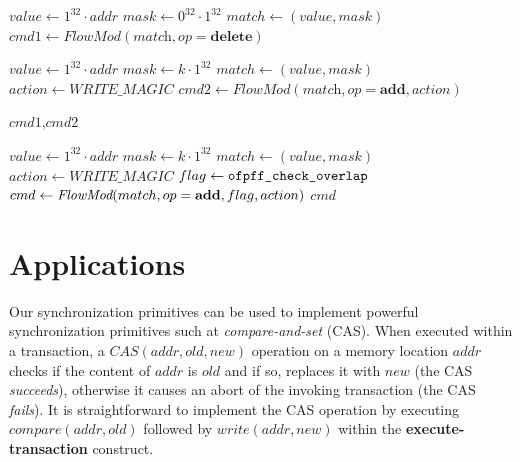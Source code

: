 \documentclass[conference]{sigcomm-alternate}
\newcommand{\concat}[0]{\cdot}
\newcommand{\cas}{CAS\xspace}
\newcommand{\compare}{compare\xspace}
\newcommand{\memwrite}{write\xspace}
\newcommand{\addr}{\textit{addr}\xspace}
\newcommand{\add}{\textbf{add}\xspace}
\newcommand{\dele}{\textbf{delete}\xspace}
\newcommand{\checko}{\texttt{check\_overlap}\xspace}
\newcommand{\execatomic}{\textbf{execute-transaction}}
\newcommand{\true}{\textit{true}}
\newcommand{\false}{\textit{false}}
\newcommand{\ones}[1]{1^{#1}}
\newcommand{\zeros}[1]{0^{#1}}
\newcommand{\memmagic}{\textit{WRITE\_MAGIC}}
\begin{document}
{\scriptsize

\begin{algorithm}[t]
    \caption{$\textit{write}(\addr,k)$}
    \label{alg:write}
    \begin{algorithmic}[1]
    		\State $value \gets \ones{32}\concat\addr$
    		\State $mask \gets  \zeros{32}\concat\ones{32}$
    		\State $match \gets (value,mask)$
    		\State $\textit{cmd1}\gets \textit{FlowMod}(\textit{match}, op = \dele) $
    		
  		   \State $value \gets \ones{32}\concat\addr$
  		   \State $mask \gets  k\concat\ones{32}$
  		   \State $match \gets (value,mask)$
 		   \State $action \gets \memmagic$
		   \State $\textit{cmd2}\gets \textit{FlowMod}(\textit{match}, op = \add,  \textit{action}) $
		    		
			\Return $\textit{cmd1}$,$\textit{cmd2}$
    \end{algorithmic}
\end{algorithm}

\begin{algorithm}[t]
    \caption{$\textit{\compare}(\addr,k)$}
    \label{alg:compare}
    \begin{algorithmic}[1]
    		\State $value \gets \ones{32}\concat\addr$
    		\State $mask \gets  k\concat\ones{32}$
    		\State $match \gets (value,mask)$
    		\State $action \gets \memmagic$
    		\State $flag \gets \texttt{ofpff\_\checko}$
    		\State $cmd\gets \emph{FlowMod}(match, op = \add, flag, action) $
			\Return $cmd$
    \end{algorithmic}
\end{algorithm}
}


\section{Applications}\label{sec:apps}

Our synchronization primitives can be used to 
implement powerful synchronization primitives such at
\emph{compare-and-set} (CAS).
When executed within a transaction, a $\cas(\addr,\textit{old},\textit{new})$ operation 
on a memory location $\addr$
checks if the content of $\addr$ is $\textit{old}$ and if so,
replaces it with $\textit{new}$ %
(the CAS \emph{succeeds}), otherwise it 
causes an abort of the invoking transaction
(the CAS \emph{fails}).
It is straightforward to implement the CAS operation by executing
$\textit{\compare}(\addr, old)$ followed by $\textit{\memwrite}(\addr,
new)$ within the {\execatomic} construct.
\end{document}
